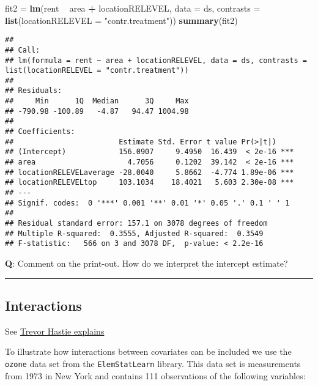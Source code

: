 \documentclass[]{article}
\newenvironment{Shaded}{\begin{snugshade}}{\end{snugshade}}
\newcommand{\DataTypeTok}[1]{\textcolor[rgb]{0.13,0.29,0.53}{#1}}
\newcommand{\KeywordTok}[1]{\textcolor[rgb]{0.13,0.29,0.53}{\textbf{#1}}}
\newcommand{\NormalTok}[1]{#1}
\newcommand{\OperatorTok}[1]{\textcolor[rgb]{0.81,0.36,0.00}{\textbf{#1}}}
\newcommand{\StringTok}[1]{\textcolor[rgb]{0.31,0.60,0.02}{#1}}
\begin{document}
\begin{Shaded}
\begin{Highlighting}[]
\NormalTok{fit2 =}\StringTok{ }\KeywordTok{lm}\NormalTok{(rent }\OperatorTok{~}\StringTok{ }\NormalTok{area }\OperatorTok{+}\StringTok{ }\NormalTok{locationRELEVEL, }\DataTypeTok{data =}\NormalTok{ ds, }\DataTypeTok{contrasts =} \KeywordTok{list}\NormalTok{(}\DataTypeTok{locationRELEVEL =} \StringTok{"contr.treatment"}\NormalTok{))}
\KeywordTok{summary}\NormalTok{(fit2)}
\end{Highlighting}
\end{Shaded}

\begin{verbatim}
## 
## Call:
## lm(formula = rent ~ area + locationRELEVEL, data = ds, contrasts = list(locationRELEVEL = "contr.treatment"))
## 
## Residuals:
##     Min      1Q  Median      3Q     Max 
## -790.98 -100.89   -4.87   94.47 1004.98 
## 
## Coefficients:
##                        Estimate Std. Error t value Pr(>|t|)    
## (Intercept)            156.0907     9.4950  16.439  < 2e-16 ***
## area                     4.7056     0.1202  39.142  < 2e-16 ***
## locationRELEVELaverage -28.0040     5.8662  -4.774 1.89e-06 ***
## locationRELEVELtop     103.1034    18.4021   5.603 2.30e-08 ***
## ---
## Signif. codes:  0 '***' 0.001 '**' 0.01 '*' 0.05 '.' 0.1 ' ' 1
## 
## Residual standard error: 157.1 on 3078 degrees of freedom
## Multiple R-squared:  0.3555, Adjusted R-squared:  0.3549 
## F-statistic:   566 on 3 and 3078 DF,  p-value: < 2.2e-16
\end{verbatim}

\textbf{Q}: Comment on the print-out. How do we interpret the intercept
estimate?

\begin{center}\rule{0.5\linewidth}{\linethickness}\end{center}

\hypertarget{interactions}{%
\subsection{Interactions}\label{interactions}}

See
\href{https://www.youtube.com/watch?v=IFzVxLv0TKQ\&list=PL5-da3qGB5IBSSCPANhTgrw82ws7w_or9\&index=5}{Trevor
Hastie explains}

To illustrate how interactions between covariates can be included we use
the \texttt{ozone} data set from the \texttt{ElemStatLearn} library.
This data set is measurements from 1973 in New York and contains 111
observations of the following variables:
\end{document}
